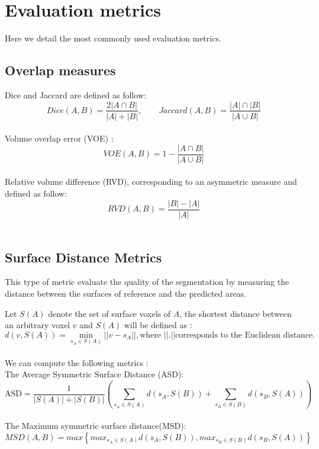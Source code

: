 \chapter{Evaluation metrics}\label{appendix---Evaluation_Metrics}

Here we detail the most commonly used evaluation metrics.

\section{Overlap measures}

Dice and Jaccard are defined as follow:\\
\[Dice(A,B) = \frac{2\left| A \cap B \right|}{\left|A\right| + \left|B\right|},\qquad Jaccard(A,B) = \frac{ \left|A\right| \cap \left|B\right|}{ \left|A \cup B\right|}\]\\
Volume overlap error (VOE) :\\
\[VOE(A,B)= 1-\frac{\left|A \cap B\right|}{\left|A\cup B\right|}\] \\
Relative volume difference (RVD), corresponding to an asymmetric measure and defined as follow: \\
\[RVD(A,B)=\frac{\left|B\right|-\left|A\right|}{\left|A\right|}\] \\



\section{Surface Distance Metrics}

This type of metric evaluate the quality of the segmentation by measuring the distance between the surfaces of reference and the predicted areas.

Let $ S(A) $ denote the set of surface voxels of $ A $, the shortest distance between an arbitrary voxel $ v $ and $ S(A) $ will be defined as :\\
\[d(v, S(A)) = \min_{s_A \in S(A)} \left|\left| v - s_A \right|\right|, \text{where } \left|\left|.\right|\right| \text{corresponds to the Euclidean distance}.\] \\
We can compute the following metrics :\\
The Average Symmetric Surface Distance (ASD):\\
\[\text{ASD} = \frac{1}{\left|S(A)\right| + \left|S(B)\right|} \left( \sum_{s_A \in S(A)} d(s_A, S(B)) + \sum_{s_B \in S(B)} d(s_B, S(A)) \right)\] \\
The Maximum symmetric surface distance(MSD): \\
\[MSD(A,B)=max{\left\{{max}_{s_A \in S(A)} d(s_A, S(B)), {max}_{s_B \in S(B)} d(s_B, S(A))\right\}}\]

